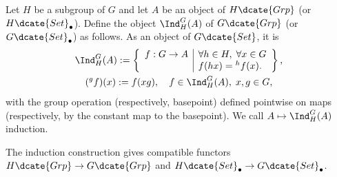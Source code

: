 \begin{definition}
	Let $H$ be a subgroup of $G$ and let $A$ be an object of
	$H\dcate{Grp}$ (or $H\dcate{Set}_\bullet$). Define the object
	$\Ind^G_H(A)$ of $G\dcate{Grp}$ (or $G\dcate{Set}_\bullet$) as follows.
	As an object of $G\dcate{Set}$, it is
	\begin{gather*}
		\Ind^G_H(A) := \left\{\begin{array}{r|l}
			f: G \to A & \forall h \in H, \; \forall x \in G \\
			& f(hx) = {}^h f(x).
		\end{array}\right\}, \\
		({}^g f)(x) := f(xg), \quad f \in \Ind^G_H(A), \; x, g \in G,
	\end{gather*}
	with the group operation (respectively, basepoint) defined pointwise on
	maps (respectively, by the constant map to the basepoint). We call
	$A\mapsto\Ind^G_H(A)$ induction.
\end{definition}

The induction construction gives compatible functors
$H\dcate{Grp}\to G\dcate{Grp}$ and
$H\dcate{Set}_\bullet\to G\dcate{Set}_\bullet$.

